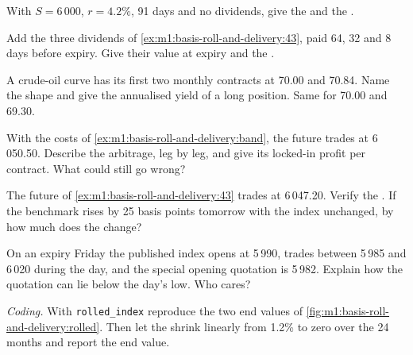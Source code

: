 \begin{exercise}[$\star$]\label{exo:m1:basis-roll-and-delivery:1}
With $S = 6\,000$, $r = 4.2\%$, 91 days and no dividends, give the 
and the .
\end{exercise}

\begin{exercise}[$\star$]\label{exo:m1:basis-roll-and-delivery:2}
Add the three dividends of \cref{ex:m1:basis-roll-and-delivery:43}, paid 64,
32 and 8 days before expiry. Give their value at expiry and the .
\end{exercise}

\begin{exercise}[$\star$]\label{exo:m1:basis-roll-and-delivery:3}
A crude-oil curve has its first two monthly contracts at 70.00 and 70.84.
Name the shape and give the annualised  yield of a long position. Same
for 70.00 and 69.30.
\end{exercise}

\begin{exercise}[$\star\star$]\label{exo:m1:basis-roll-and-delivery:4}
With the costs of \cref{ex:m1:basis-roll-and-delivery:band}, the future trades
at 6\,050.50. Describe the arbitrage, leg by leg, and give its locked-in
profit per contract. What could still go wrong?
\end{exercise}

\begin{exercise}[$\star\star$]\label{exo:m1:basis-roll-and-delivery:5}
The future of \cref{ex:m1:basis-roll-and-delivery:43} trades at 6\,047.20.
Verify the . If the benchmark rises by 25 basis points
tomorrow with the index unchanged, by how much does the  change?
\end{exercise}

\begin{exercise}[$\star\star$]\label{exo:m1:basis-roll-and-delivery:6}
On an expiry Friday the published index opens at 5\,990, trades between
5\,985 and 6\,020 during the day, and the special opening quotation is
5\,982. Explain how the quotation can lie below the day's low. Who cares?
\end{exercise}

\begin{exercise}[$\star\star\star$]\label{exo:m1:basis-roll-and-delivery:7}
\emph{Coding.} With \texttt{rolled\_index} reproduce the two end values of
\cref{fig:m1:basis-roll-and-delivery:rolled}. Then let the  shrink
linearly from 1.2\% to zero over the 24 months and report the end value.
\end{exercise}

